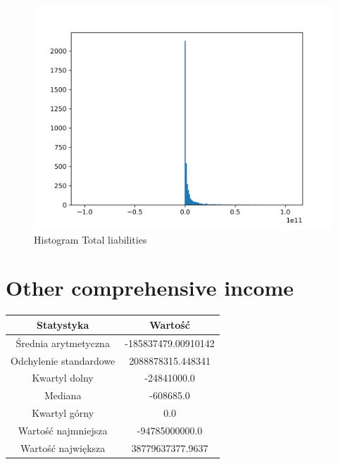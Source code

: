 \documentclass{article}
\begin{document}
\begin{figure}[h!]
    \includegraphics[width=\linewidth]{variables/Total liabilities.png}
    \caption{Histogram Total liabilities }
\end{figure}\section{ Other comprehensive income }

\begin{center}
    \begin{tabular}{|c | c|} 
    \hline
    Statystyka & Wartość \\
    \hline\hline
    Średnia arytmetyczna & -185837479.00910142 \\ 
    \hline
    Odchylenie standardowe & 2088878315.448341 \\
    \hline
    Kwartyl dolny & -24841000.0 \\
    \hline
    Mediana & -608685.0 \\
    \hline
    Kwartyl górny & 0.0 \\
    \hline
    Wartość najmniejsza & -94785000000.0 \\
    \hline
    Wartość największa & 38779637377.9637 \\
    \hline
   \end{tabular}
\end{center}
\end{document}
